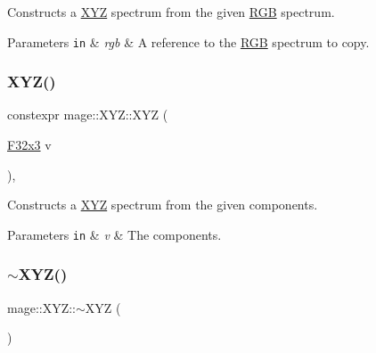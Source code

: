 Constructs a \mbox{\hyperlink{structmage_1_1_x_y_z}{X\+YZ}} spectrum from the given \mbox{\hyperlink{structmage_1_1_r_g_b}{R\+GB}} spectrum.


\begin{DoxyParams}[1]{Parameters}
\mbox{\tt in}  & {\em rgb} & A reference to the \mbox{\hyperlink{structmage_1_1_r_g_b}{R\+GB}} spectrum to copy. \\
\hline
\end{DoxyParams}
\mbox{\label{structmage_1_1_x_y_z_af2edf71f76a8c7d457229adaf904fb07}} 
\subsubsection{\texorpdfstring{X\+Y\+Z()}{XYZ()}\hspace{0.1cm}{\footnotesize\ttfamily [6/6]}}
{\footnotesize\ttfamily constexpr mage\+::\+X\+Y\+Z\+::\+X\+YZ (\begin{DoxyParamCaption}\item[{\mbox{\hyperlink{namespacemage_a0fef5ab4e073c2d9ea876fefa3da4233}{F32x3}}}]{v }\end{DoxyParamCaption})\hspace{0.3cm}{\ttfamily [explicit]}, {\ttfamily [noexcept]}}

Constructs a \mbox{\hyperlink{structmage_1_1_x_y_z}{X\+YZ}} spectrum from the given components.


\begin{DoxyParams}[1]{Parameters}
\mbox{\tt in}  & {\em v} & The components. \\
\hline
\end{DoxyParams}
\mbox{\label{structmage_1_1_x_y_z_a07eb7ce1ad3308774b0bbad3a7f121ce}} 
\subsubsection{\texorpdfstring{$\sim$\+X\+Y\+Z()}{~XYZ()}}
{\footnotesize\ttfamily mage\+::\+X\+Y\+Z\+::$\sim$\+X\+YZ (\begin{DoxyParamCaption}{ }\end{DoxyParamCaption})\hspace{0.3cm}{\ttfamily [default]}}

